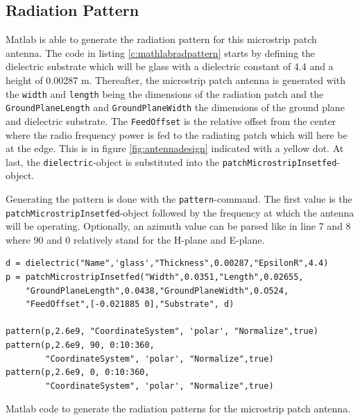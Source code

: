 \subsection{Radiation Pattern}
Matlab is able to generate the radiation pattern for this microstrip patch antenna.
The code in  listing \ref{c:mathlabradpattern} starts by defining the dielectric substrate which will be glass with a \gls{dielectric constant}
of 4.4 and a height of 0.00287 m. Thereafter, the microstrip patch antenna is generated with the \verb|width| and \verb|length| being the dimensions
of the radiation patch and the \verb|GroundPlaneLength| and \verb|GroundPlaneWidth| the dimensions of the ground plane and dielectric substrate.
The \verb|FeedOffset| is the relative offset from the center where the radio frequency power is fed to the radiating patch which will here be
at the edge. This is in figure \ref{fig:antennadesign} indicated with a yellow dot. At last, the \verb|dielectric|-object is substituted into the 
\verb|patchMicrostripInsetfed|-object.

Generating the pattern is done with the \verb|pattern|-command. The first value is the \\ \verb|patchMicrostripInsetfed|-object followed by the frequency
at which the antenna will be operating. Optionally, an azimuth value can be parsed like in line 7 and 8 where 90 and 0 relatively stand for the H-plane and E-plane.

\begin{listing}[h!]
\begin{verbatim}
d = dielectric("Name",'glass',"Thickness",0.00287,"EpsilonR",4.4)
p = patchMicrostripInsetfed("Width",0.0351,"Length",0.02655,
    "GroundPlaneLength",0.0438,"GroundPlaneWidth",0.O524,
    "FeedOffset",[-0.021885 0],"Substrate", d)

pattern(p,2.6e9, "CoordinateSystem", 'polar', "Normalize",true)
pattern(p,2.6e9, 90, 0:10:360, 
        "CoordinateSystem", 'polar', "Normalize",true)
pattern(p,2.6e9, 0, 0:10:360, 
        "CoordinateSystem", 'polar', "Normalize",true)
\end{verbatim}
\caption{Matlab code to generate the radiation patterns for the microstrip patch antenna.}
\label{c:mathlabradpattern}
\end{listing}


